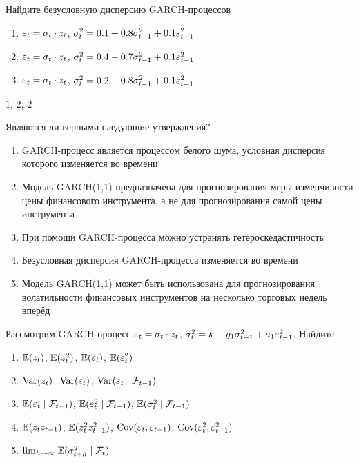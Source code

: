 \documentclass[pdftex,11pt,openany]{book}\usepackage[]{graphicx}\usepackage[]{color}
\begin{document}
\begin{solution}
\end{solution}


\begin{problem}
Найдите безусловную дисперсию GARCH-процессов 
\begin{enumerate}
\item $\varepsilon_t=\sigma_t \cdot z_t$, $\sigma^2_t=0.1+0.8\sigma^2_{t-1}+0.1\varepsilon^2_{t-1}$
\item $\varepsilon_t=\sigma_t \cdot z_t$, $\sigma^2_t=0.4+0.7\sigma^2_{t-1}+0.1\varepsilon^2_{t-1}$
\item $\varepsilon_t=\sigma_t \cdot z_t$, $\sigma^2_t=0.2+0.8\sigma^2_{t-1}+0.1\varepsilon^2_{t-1}$
\end{enumerate}
\end{problem}

\begin{solution}
$1$, $2$, $2$ 
\end{solution}


\begin{problem}
Являются ли верными следующие утверждения?
\begin{enumerate}
\item GARCH-процесс является процессом белого шума, условная дисперсия которого
изменяется во времени
\item Модель GARCH(1,1) предназначена для прогнозирования меры изменчивости цены
финансового инструмента, а не для прогнозирования самой цены инструмента
\item При помощи GARCH-процесса можно устранять гетероскедастичность
\item Безусловная дисперсия GARCH-процесса изменяется во времени
\item Модель GARCH(1,1) может быть использована для прогнозирования
волатильности финансовых инструментов на несколько торговых недель вперёд     
\end{enumerate}
\end{problem}

\begin{solution}
\end{solution}


\begin{problem}
Рассмотрим GARCH-процесс $\varepsilon_t=\sigma_t \cdot z_t$, $\sigma^2_t=k+g_1\sigma^2_{t-1}+a_1\varepsilon^2_{t-1}$. Найдите
\begin{enumerate}
\item $\mathbb{E}(z_t)$, $\mathbb{E}(z_t^2)$, $\mathbb{E}(\varepsilon_t)$, $\mathbb{E}(\varepsilon_t^2)$
\item $\operatorname{Var}(z_t)$, $\operatorname{Var}(\varepsilon_t)$, $\operatorname{Var}(\varepsilon_t \mid \mathcal{F}_{t-1})$
\item $\mathbb{E}(\varepsilon_t \mid \mathcal{F}_{t-1})$, $\mathbb{E}(\varepsilon_t^2 \mid \mathcal{F}_{t-1})$, $\mathbb{E}(\sigma^2_t \mid \mathcal{F}_{t-1})$
\item $\mathbb{E}(z_tz_{t-1})$, $\mathbb{E}(z_t^2z_{t-1}^2)$, $\operatorname{Cov}(\varepsilon_t,\varepsilon_{t-1})$, $\operatorname{Cov}(\varepsilon_t^2,\varepsilon_{t-1}^2)$
\item $\lim_{h\rightarrow\infty} \mathbb{E}(\sigma^2_{t+h} \mid \mathcal{F}_t)$
\end{enumerate}
\end{problem}
\end{document}

